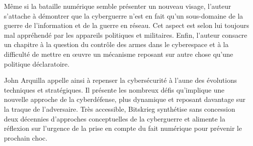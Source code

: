 Même si la bataille numérique semble présenter un nouveau visage, l’auteur s’attache à démontrer que la cyberguerre n’est en fait qu’un sous-domaine de la guerre de l’information et de la guerre en réseau. Cet aspect est selon lui toujours mal appréhendé par les appareils politiques et militaires. Enfin, l’auteur consacre un chapitre à la question du contrôle des armes dans le cyberespace et à la difficulté de mettre en œuvre un mécanisme reposant sur autre chose qu’une politique déclaratoire.

John Arquilla appelle ainsi à repenser la cybersécurité à l’aune des évolutions techniques et stratégiques. Il présente les nombreux défis qu’implique une nouvelle approche de la cyberdéfense, plus dynamique et reposant davantage sur la traque de l’adversaire. Très accessible, Bitskrieg synthétise sans concession deux décennies d’approches conceptuelles de la cyberguerre et alimente la réflexion sur l’urgence de la prise en compte du fait numérique pour prévenir le prochain choc.
